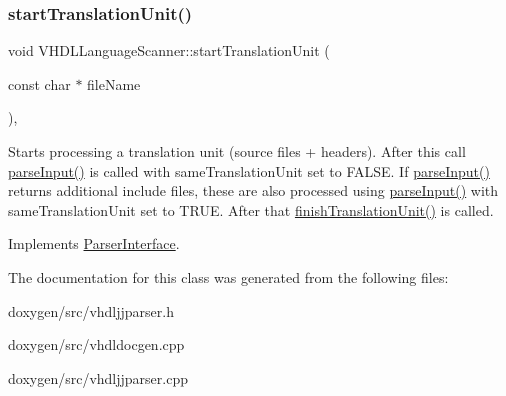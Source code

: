 \mbox{\label{class_v_h_d_l_language_scanner_a57e38f82bcb0ab8af7d6dabe131ad394}} 
\subsubsection{\texorpdfstring{startTranslationUnit()}{startTranslationUnit()}}
{\footnotesize\ttfamily void V\+H\+D\+L\+Language\+Scanner\+::start\+Translation\+Unit (\begin{DoxyParamCaption}\item[{const char $\ast$}]{file\+Name }\end{DoxyParamCaption})\hspace{0.3cm}{\ttfamily [inline]}, {\ttfamily [virtual]}}

Starts processing a translation unit (source files + headers). After this call \mbox{\hyperlink{class_v_h_d_l_language_scanner_a604cae09257525fbca32c10ffeb6e961}{parse\+Input()}} is called with same\+Translation\+Unit set to F\+A\+L\+SE. If \mbox{\hyperlink{class_v_h_d_l_language_scanner_a604cae09257525fbca32c10ffeb6e961}{parse\+Input()}} returns additional include files, these are also processed using \mbox{\hyperlink{class_v_h_d_l_language_scanner_a604cae09257525fbca32c10ffeb6e961}{parse\+Input()}} with same\+Translation\+Unit set to T\+R\+UE. After that \mbox{\hyperlink{class_v_h_d_l_language_scanner_a1c08cc94a1cd79fdaf8a102935089445}{finish\+Translation\+Unit()}} is called. 

Implements \mbox{\hyperlink{class_parser_interface_a72478f87ead5fde10d7d6bbe32a73024}{Parser\+Interface}}.



The documentation for this class was generated from the following files\+:\begin{DoxyCompactItemize}
\item 
doxygen/src/vhdljjparser.\+h\item 
doxygen/src/vhdldocgen.\+cpp\item 
doxygen/src/vhdljjparser.\+cpp\end{DoxyCompactItemize}
